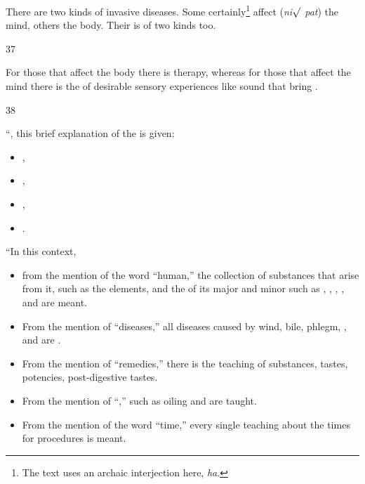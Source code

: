 \begin{translation}
    \begin{sloka}
        There are two kinds of invasive diseases. Some certainly\footnote{The
        text uses an archaic interjection here, \emph{ha}.} 
        affect (\emph{ni$\surd$ pat}) 
        the
        mind, others the body. Their  is of two kinds too.
    \end{sloka}
    
    \item[37]
    
    \begin{sloka}
        For those that affect the body there is  
        therapy, whereas for those that affect the mind there is the 
         of desirable sensory experiences like sound that 
        bring .    
    \end{sloka}
    
    \item [38] 
    
“, this brief explanation of the 
    is given: \begin{itemize}
        \item    
        ,
        \item
        ,
        \item
        ,
        \item
        .
    \end{itemize}
“In this context, 
    \begin{itemize}
        \item from the mention of the word “human,” the collection of 
        substances that arise from it, such as the elements, and the 
         of its major 
        and minor  such as 
        , 
        , 
        , 
        , 
         and 
        are meant.
        \item
        From the mention of “diseases,” all diseases 
        caused by
        wind, bile, phlegm,
        ,
         and 
         are .
        \item
        From the mention of “remedies,”
        there is the teaching of 
        substances,
        tastes, 
        potencies,
        post-digestive tastes.
        \item
        From the mention of 
        “,”
         such as oiling
        and 
         are taught.
        \item
        From the mention of the word “time,” every single teaching about the times for
        procedures is meant.        
    \end{itemize}
  

\end{translation}
